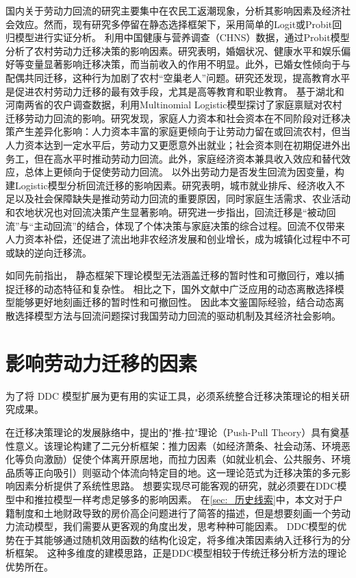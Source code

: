 \documentclass[a4paper, zihao=-4, fontset = mac, oneside]{ctexbook} %
\begin{document}
国内关于劳动力回流的研究主要集中在农民工返潮现象，分析其影响因素及经济社会效应。然而，现有研究多停留在静态选择框架下，采用简单的Logit或Probit回归模型进行实证分析。
\textcite{WangZhiQiangZhongGuoNongCunLaoDongLiQianYiYingXiangYinSuYanJiuJiYuProbitMoXingDeShiZhengFenXi2011}利用中国健康与营养调查（CHNS）数据，通过Probit模型分析了农村劳动力迁移决策的影响因素。研究表明，婚姻状况、健康水平和娱乐偏好等变量显著影响迁移决策，而当前收入的作用不明显。此外，已婚女性倾向于与配偶共同迁移，这种行为加剧了农村“空巢老人”问题。研究还发现，提高教育水平是促进农村劳动力迁移的最有效手段，尤其是高等教育和职业教育。
\textcite{ShiZhiLeiJiaTingBingFuJiaTingJueCeYuNongCunQianYiLaoDongLiHuiLiu2012}基于湖北和河南两省的农户调查数据，利用Multinomial Logistic模型探讨了家庭禀赋对农村迁移劳动力回流的影响。研究发现，家庭人力资本和社会资本在不同阶段对迁移决策产生差异化影响：人力资本丰富的家庭更倾向于让劳动力留在或回流农村，但当人力资本达到一定水平后，劳动力又更愿意外出就业；社会资本则在初期促进外出务工，但在高水平时推动劳动力回流。此外，家庭经济资本兼具收入效应和替代效应，总体上更倾向于促使劳动力回流。
\textcite{RenYuanNongCunWaiChuLaoDongLiHuiLiuQianYiDeYingXiangYinSuHeHuiLiuXiaoYing2017}以外出劳动力是否发生回流为因变量，构建Logistic模型分析回流迁移的影响因素。研究表明，城市就业排斥、经济收入不足以及社会保障缺失是推动劳动力回流的重要原因，同时家庭生活需求、农业活动和农地状况也对回流决策产生显著影响。研究进一步指出，回流迁移是“被动回流”与“主动回流”的结合，体现了个体决策与家庭决策的综合过程。回流不仅带来人力资本补偿，还促进了流出地非农经济发展和创业增长，成为城镇化过程中不可或缺的逆向迁移流。


如同先前指出，
静态框架下理论模型无法涵盖迁移的暂时性和可撤回行，难以捕捉迁移的动态特征和复杂性。
相比之下，国外文献中广泛应用的动态离散选择模型能够更好地刻画迁移的暂时性和可撤回性。
因此本文鉴国际经验，结合动态离散选择模型方法与回流问题探讨我国劳动力回流的驱动机制及其经济社会影响。

\section{影响劳动力迁移的因素}
\label{sec:_影响劳动力迁移的因素}

为了将 DDC 模型扩展为更有用的实证工具，必须系统整合迁移决策理论的相关研究成果。

在迁移决策理论的发展脉络中，\textcite{leeTheoryMigration1966}提出的"推-拉"理论（Push-Pull Theory）具有奠基性意义。该理论构建了二元分析框架：推力因素（如经济萧条、社会动荡、环境恶化等负向激励）促使个体离开原居地，而拉力因素（如就业机会、公共服务、环境品质等正向吸引）则驱动个体流向特定目的地。这一理论范式为迁移决策的多元影响因素分析提供了系统性思路。
想要实现尽可能客观的研究，就必须要在DDC模型中和推拉模型一样考虑足够多的影响因素。
在\ref{sec:_历史线索}中，本文对于户籍制度和土地财政导致的房价高企问题进行了简答的描述，但是想要刻画一个劳动力流动模型，我们需要从更客观的角度出发，思考种种可能因素。
DDC模型的优势在于其能够通过随机效用函数的结构化设定，将多维决策因素纳入迁移行为的分析框架。
这种多维度的建模思路，正是DDC模型相较于传统迁移分析方法的理论优势所在。
\end{document}
